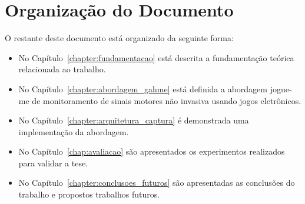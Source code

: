 \section{Organização do Documento}
O restante deste documento está organizado da seguinte forma:
\begin{itemize}
	\item No Capítulo~\ref{chapter:fundamentacao} está descrita a fundamentação teórica relacionada ao trabalho.
	\item No Capítulo~\ref{chapter:abordagem_gahme} está definida a abordagem \ac{jogue-me} de monitoramento de sinais motores não invasiva usando jogos eletrônicos.
	\item No Capítulo~\ref{chapter:arquitetura_captura} é demonstrada uma implementação da abordagem.
	\item No Capítulo~\ref{chap:avaliacao} são apresentados os experimentos realizados para validar a tese.
	\item No Capítulo~\ref{chapter:conclusoes_futuros} são apresentadas as conclusões do trabalho e propostos trabalhos futuros.
\end{itemize}

